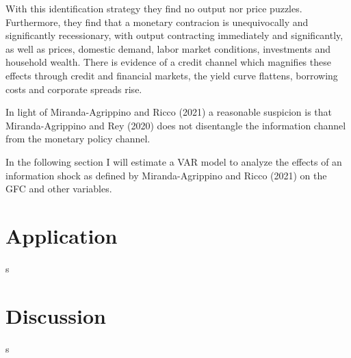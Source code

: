\documentclass[10pt,a4paper,draft]{article}
\begin{document}
With this identification strategy they find no output nor price puzzles. Furthermore, they find that a monetary contracion is unequivocally and significantly recessionary, with output contracting immediately and significantly, as well as prices, domestic demand, labor market conditions, investments and household wealth. There is evidence of a credit channel which magnifies these effects through credit and financial markets, the yield curve flattens, borrowing costs and corporate spreads rise.



In light of Miranda-Agrippino and Ricco (2021) a reasonable suspicion is that Miranda-Agrippino and Rey (2020) does not disentangle the information channel from the monetary policy channel.



In the following section I will estimate a VAR model to analyze the effects of an information shock as defined by Miranda-Agrippino and Ricco (2021) on the GFC and other variables. 

\section{Application}
s


\section{Discussion}


s
\end{document}
